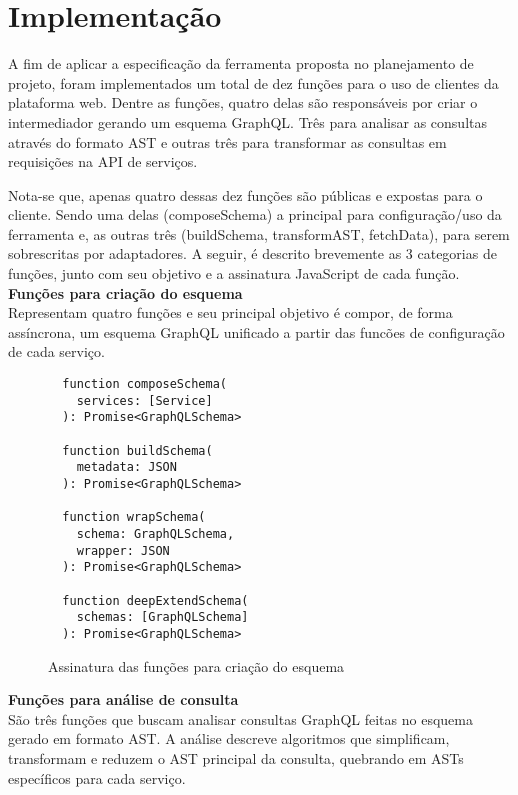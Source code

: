 \section{Implementação}

A fim de aplicar a especificação da ferramenta proposta no planejamento de projeto, foram implementados um total de dez funções para o uso de clientes da plataforma web. Dentre as funções, quatro delas são responsáveis por criar o intermediador gerando um esquema GraphQL. Três para analisar as consultas através do formato AST e outras três para transformar as consultas em requisições na API de serviços.

Nota-se que, apenas quatro dessas dez funções são públicas e expostas para o cliente. Sendo uma delas (composeSchema) a principal para configuração/uso da ferramenta e, as outras três (buildSchema, transformAST, fetchData), para serem sobrescritas por adaptadores. A seguir, é descrito brevemente as 3 categorias de funções, junto com seu objetivo e a assinatura JavaScript de cada função. \\

\textbf{Funções para criação do esquema} \\

Representam quatro funções e seu principal objetivo é compor, de forma assíncrona, um esquema GraphQL unificado a partir das funcões de configuração de cada serviço.

\begin{figure}[H]
  \centering
  \begin{verbatim}
  function composeSchema(
    services: [Service]
  ): Promise<GraphQLSchema>

  function buildSchema(
    metadata: JSON
  ): Promise<GraphQLSchema>

  function wrapSchema(
    schema: GraphQLSchema,
    wrapper: JSON
  ): Promise<GraphQLSchema>

  function deepExtendSchema(
    schemas: [GraphQLSchema]
  ): Promise<GraphQLSchema>
  \end{verbatim}
  \caption{Assinatura das funções para criação do esquema}
\end{figure}

\textbf{Funções para análise de consulta} \\

São três funções que buscam analisar consultas GraphQL feitas no esquema gerado em formato AST. A análise descreve algoritmos que simplificam, transformam e reduzem o AST principal da consulta, quebrando em ASTs específicos para cada serviço.

